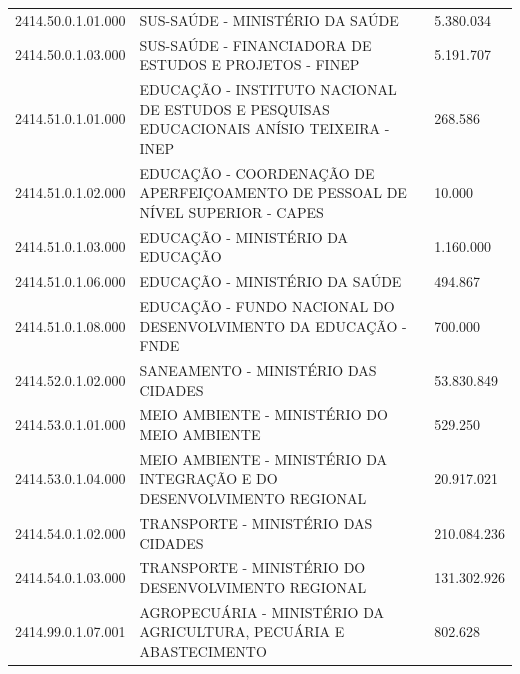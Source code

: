 \documentclass{article}
\begin{document}
\begin{longtable}[c]{m{2cm}|m{13cm}|m{2cm}}
\multicolumn{1}{C{2cm}|}{2414.50.0.1.01.000} & \multicolumn{1}{L{13cm}|}{SUS-SAÚDE - MINISTÉRIO DA SAÚDE} & \multicolumn{1}{R{2cm}}{5.380.034} \\
\multicolumn{1}{C{2cm}|}{2414.50.0.1.03.000} & \multicolumn{1}{L{13cm}|}{SUS-SAÚDE - FINANCIADORA DE ESTUDOS E PROJETOS - FINEP} & \multicolumn{1}{R{2cm}}{5.191.707} \\
\multicolumn{1}{C{2cm}|}{2414.51.0.1.01.000} & \multicolumn{1}{L{13cm}|}{EDUCAÇÃO - INSTITUTO NACIONAL DE ESTUDOS E PESQUISAS EDUCACIONAIS ANÍSIO TEIXEIRA - INEP} & \multicolumn{1}{R{2cm}}{268.586} \\
\multicolumn{1}{C{2cm}|}{2414.51.0.1.02.000} & \multicolumn{1}{L{13cm}|}{EDUCAÇÃO - COORDENAÇÃO DE APERFEIÇOAMENTO DE PESSOAL DE NÍVEL SUPERIOR - CAPES} & \multicolumn{1}{R{2cm}}{10.000} \\
\multicolumn{1}{C{2cm}|}{2414.51.0.1.03.000} & \multicolumn{1}{L{13cm}|}{EDUCAÇÃO - MINISTÉRIO DA EDUCAÇÃO} & \multicolumn{1}{R{2cm}}{1.160.000} \\
\multicolumn{1}{C{2cm}|}{2414.51.0.1.06.000} & \multicolumn{1}{L{13cm}|}{EDUCAÇÃO - MINISTÉRIO DA SAÚDE} & \multicolumn{1}{R{2cm}}{494.867} \\
\multicolumn{1}{C{2cm}|}{2414.51.0.1.08.000} & \multicolumn{1}{L{13cm}|}{EDUCAÇÃO - FUNDO NACIONAL DO DESENVOLVIMENTO DA EDUCAÇÃO - FNDE} & \multicolumn{1}{R{2cm}}{700.000} \\
\multicolumn{1}{C{2cm}|}{2414.52.0.1.02.000} & \multicolumn{1}{L{13cm}|}{SANEAMENTO - MINISTÉRIO DAS CIDADES} & \multicolumn{1}{R{2cm}}{53.830.849} \\
\multicolumn{1}{C{2cm}|}{2414.53.0.1.01.000} & \multicolumn{1}{L{13cm}|}{MEIO AMBIENTE - MINISTÉRIO DO MEIO AMBIENTE} & \multicolumn{1}{R{2cm}}{529.250} \\
\multicolumn{1}{C{2cm}|}{2414.53.0.1.04.000} & \multicolumn{1}{L{13cm}|}{MEIO AMBIENTE - MINISTÉRIO DA INTEGRAÇÃO E DO DESENVOLVIMENTO REGIONAL} & \multicolumn{1}{R{2cm}}{20.917.021} \\
\multicolumn{1}{C{2cm}|}{2414.54.0.1.02.000} & \multicolumn{1}{L{13cm}|}{TRANSPORTE - MINISTÉRIO DAS CIDADES} & \multicolumn{1}{R{2cm}}{210.084.236} \\
\multicolumn{1}{C{2cm}|}{2414.54.0.1.03.000} & \multicolumn{1}{L{13cm}|}{TRANSPORTE - MINISTÉRIO DO DESENVOLVIMENTO REGIONAL} & \multicolumn{1}{R{2cm}}{131.302.926} \\
\multicolumn{1}{C{2cm}|}{2414.99.0.1.07.001} & \multicolumn{1}{L{13cm}|}{AGROPECUÁRIA - MINISTÉRIO DA AGRICULTURA, PECUÁRIA E ABASTECIMENTO} & \multicolumn{1}{R{2cm}}{802.628} \\

\end{longtable}
\end{document}
